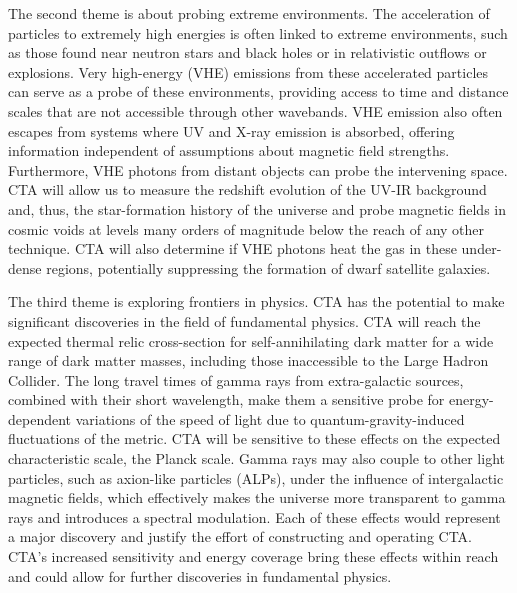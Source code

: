 The second theme is about probing extreme environments. The acceleration of particles to extremely high energies is often linked to extreme environments, such as those found near neutron stars and black holes or in relativistic outflows or explosions. Very high-energy (VHE) emissions from these accelerated particles can serve as a probe of these environments, providing access to time and distance scales that are not accessible through other wavebands. VHE emission also often escapes from systems where UV and X-ray emission is absorbed, offering information independent of assumptions about magnetic field strengths. Furthermore, VHE photons from distant objects can probe the intervening space. CTA will allow us to measure the redshift evolution of the UV-IR background and, thus, the star-formation history of the universe and probe magnetic fields in cosmic voids at levels many orders of magnitude below the reach of any other technique. CTA will also determine if VHE photons heat the gas in these under-dense regions, potentially suppressing the formation of dwarf satellite galaxies.

The third theme is exploring frontiers in physics. CTA has the potential to make significant discoveries in the field of fundamental physics. CTA will reach the expected thermal relic cross-section for self-annihilating dark matter for a wide range of dark matter masses, including those inaccessible to the Large Hadron Collider. The long travel times of gamma rays from extra-galactic sources, combined with their short wavelength, make them a sensitive probe for energy-dependent variations of the speed of light due to quantum-gravity-induced fluctuations of the metric. CTA will be sensitive to these effects on the expected characteristic scale, the Planck scale. Gamma rays may also couple to other light particles, such as axion-like particles (ALPs), under the influence of intergalactic magnetic fields, which effectively makes the universe more transparent to gamma rays and introduces a spectral modulation. Each of these effects would represent a major discovery and justify the effort of constructing and operating CTA. CTA's increased sensitivity and energy coverage bring these effects within reach and could allow for further discoveries in fundamental physics.


